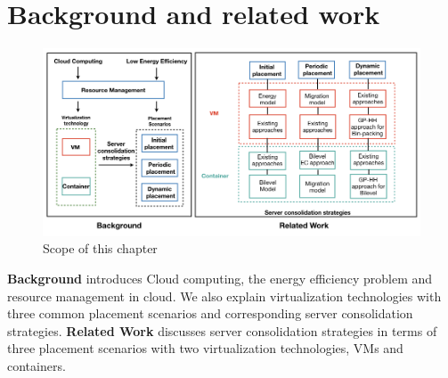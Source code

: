 \chapter{Background and related work}\label{C:background}

\begin{figure}[H]
	\centering
	\includegraphics[width=\textwidth]{pics/scope.png}
	\caption{Scope of this chapter}
	\label{fig:scope}
\end{figure}

\textbf{Background} introduces Cloud computing, the energy efficiency problem and resource management in cloud. We also explain virtualization technologies  with three common placement scenarios and corresponding server consolidation strategies. \textbf{Related Work} discusses server consolidation strategies in terms of three placement scenarios with two virtualization technologies, VMs and containers.



